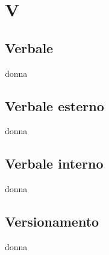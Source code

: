 \section{V} 
\subsection{Verbale} 
donna
\subsection{Verbale esterno} 
donna
\subsection{Verbale interno} 
donna
\subsection{Versionamento} 
donna
